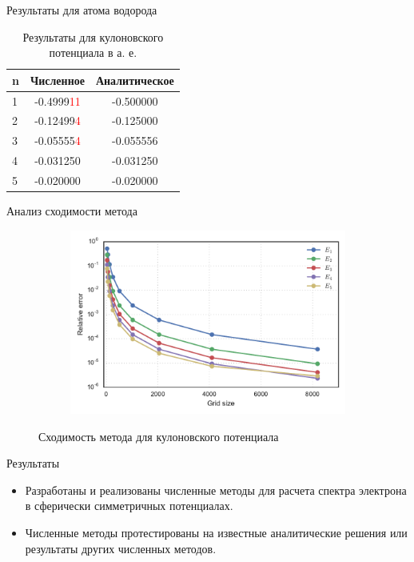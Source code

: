 \documentclass{beamer}
\begin{document}
\begin{frame}{Результаты для атома водорода}
\begin{table}
\begin{tabular}{l | c | c   }
n & Численное & Аналитическое \\
\hline \hline
1 & -0.4999\textcolor{red}{11}& -0.500000 \\
2 & -0.12499\textcolor{red}{4} & -0.125000 \\
3 & -0.05555\textcolor{red}{4} & -0.055556 \\
4 & -0.031250 & -0.031250 \\
5 & -0.020000 & -0.020000 \\
\end{tabular}
\caption{Результаты для кулоновского потенциала в а. е.}
\end{table}
\end{frame}


\begin{frame}{Анализ сходимости метода}
 \begin{figure}[h!]
\centering
\begin{subfigure}{.8\textwidth}
  \centering
  \includegraphics[width=1.0\linewidth]{h2_grid.pdf}
\end{subfigure}
\caption{Сходимость метода для кулоновского потенциала}
\end{figure}
\end{frame}




\begin{frame}{Результаты}
 \begin{itemize}
    		\item Разработаны и реализованы численные методы для расчета спектра электрона в сферически симметричных потенциалах.
    		\item Численные методы протестированы на известные аналитические решения или результаты других численных методов.
    		
   \end{itemize}
\end{frame}
\end{document}
